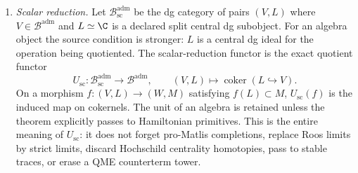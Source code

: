 \begin{defn}
\begin{enumerate}[label=\textup{(A\arabic*)}]
    \item\label{adm:scalar-reduction-functor}
      \emph{Scalar reduction.}  Let
      \(\mathcal B^{\mathrm{adm}}_{\mathrm{sc}}\) be the dg category of
      pairs \((V,L)\) where \(V\in\mathcal B^{\mathrm{adm}}\) and
      \(L\simeq\C\) is a declared split central dg subobject.  For an
      algebra object the source condition is stronger: \(L\) is a
      central dg ideal for the operation being quotiented.  The
      scalar-reduction functor is the exact quotient functor
      \[
        U_{\mathrm{sc}}\colon
        \mathcal B^{\mathrm{adm}}_{\mathrm{sc}}\longrightarrow
        \mathcal B^{\mathrm{adm}},
        \qquad
        (V,L)\longmapsto \operatorname{coker}(L\hookrightarrow V).
      \]
      On a morphism \(f\colon(V,L)\to(W,M)\) satisfying
      \(f(L)\subset M\), \(U_{\mathrm{sc}}(f)\) is the induced map on
      cokernels.  The unit of an algebra is retained unless the
      theorem explicitly passes to Hamiltonian primitives.  This is the
      entire meaning of \(U_{\mathrm{sc}}\): it does not forget
      pro-Matlis completions, replace Roos limits by strict limits,
      discard Hochschild centrality homotopies, pass to stable traces,
      or erase a QME counterterm tower.


\end{enumerate}
\end{defn}
